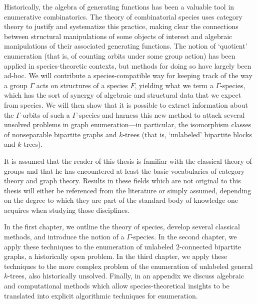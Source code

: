 \documentclass[distribution,draft]{brandiss} %
\numberwithin{section}{chapter}
\numberwithin{figure}{chapter}
\begin{document}
\begin{disspreface}
  Historically, the algebra of generating functions has been a valuable tool in enumerative combinatorics.
  The theory of combinatorial species uses category theory to justify and systematize this practice, making clear the connections between structural manipulations of some objects of interest and algebraic manipulations of their associated generating functions.
  The notion of `quotient' enumeration (that is, of counting orbits under some group action) has been applied in species-theoretic contexts, but methods for doing so have largely been ad-hoc.
  We will contribute a species-compatible way for keeping track of the way a group $\Gamma$ acts on structures of a species $F$, yielding what we term a $\Gamma$-species, which has the sort of synergy of algebraic and structural data that we expect from species.
  We will then show that it is possible to extract information about the $\Gamma$-orbits of such a $\Gamma$-species and harness this new method to attack several unsolved problems in graph enumeration---in particular, the isomorphism classes of nonseparable bipartite graphs and $k$-trees (that is, `unlabeled' bipartite blocks and $k$-trees).

  It is assumed that the reader of this thesis is familiar with the classical theory of groups and that he has encountered at least the basic vocabularies of category theory and graph theory.
  Results in these fields which are not original to this thesis will either be referenced from the literature or simply assumed, depending on the degree to which they are part of the standard body of knowledge one acquires when studying those disciplines.

  In the first chapter, we outline the theory of species, develop several classical methods, and introduce the notion of a $\Gamma$-species.
  In the second chapter, we apply these techniques to the enumeration of unlabeled $2$-connected bipartite graphs, a historically open problem.
  In the third chapter, we apply these techniques to the more complex problem of the enumeration of unlabeled general $k$-trees, also historically unsolved.
  Finally, in an appendix we discuss algebraic and computational methods which allow species-theoretical insights to be translated into explicit algorithmic techniques for enumeration.
\end{disspreface}

\setcounter{tocdepth}{2}
\tableofcontents %

\listoffigures %
\end{document}
